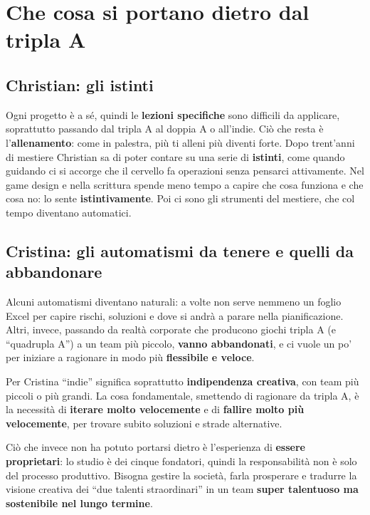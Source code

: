 \section{Che cosa si portano dietro dal tripla A}
\label{sec:c3-4-esperienza}

\subsection{Christian: gli istinti}

Ogni progetto è a sé, quindi le \textbf{lezioni specifiche} sono difficili da
applicare, soprattutto passando dal tripla A al doppia A o all'indie. Ciò che resta
è l'\textbf{allenamento}: come in palestra, più ti alleni più diventi forte. Dopo
trent'anni di mestiere Christian sa di poter contare su una serie di
\textbf{istinti}, come quando guidando ci si accorge che il cervello fa operazioni
senza pensarci attivamente. Nel game design e nella scrittura spende meno tempo a
capire che cosa funziona e che cosa no: lo sente \textbf{istintivamente}. Poi ci
sono gli strumenti del mestiere, che col tempo diventano automatici.

\subsection{Cristina: gli automatismi da tenere e quelli da abbandonare}

Alcuni automatismi diventano naturali: a volte non serve nemmeno un foglio Excel per
capire rischi, soluzioni e dove si andrà a parare nella pianificazione. Altri,
invece, passando da realtà corporate che producono giochi tripla A (e ``quadrupla
A'') a un team più piccolo, \textbf{vanno abbandonati}, e ci vuole un po' per
iniziare a ragionare in modo più \textbf{flessibile e veloce}.

Per Cristina ``indie'' significa soprattutto \textbf{indipendenza creativa}, con team
più piccoli o più grandi. La cosa fondamentale, smettendo di ragionare da tripla A,
è la necessità di \textbf{iterare molto velocemente} e di \textbf{fallire molto più
velocemente}, per trovare subito soluzioni e strade alternative.

Ciò che invece non ha potuto portarsi dietro è l'esperienza di \textbf{essere
proprietari}: lo studio è dei cinque fondatori, quindi la responsabilità non è solo
del processo produttivo. Bisogna gestire la società, farla prosperare e tradurre la
visione creativa dei ``due talenti straordinari'' in un team \textbf{super
talentuoso ma sostenibile nel lungo termine}.

